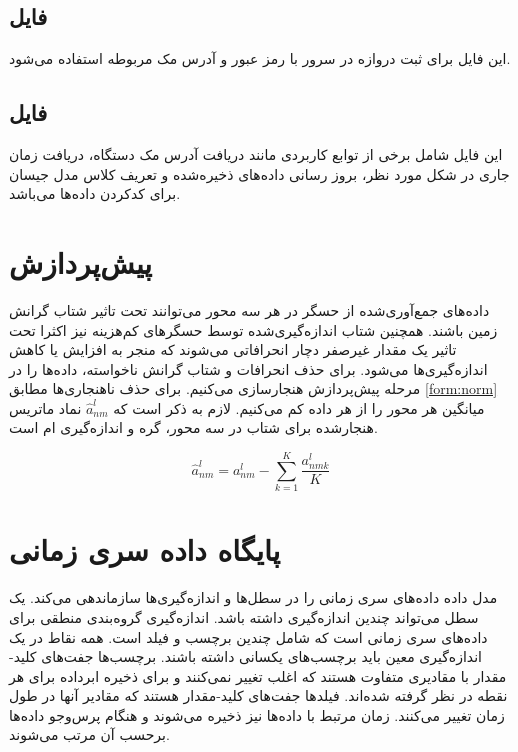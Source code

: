 \subsection{فایل }

این فایل برای ثبت دروازه در سرور با رمز عبور و آدرس مک مربوطه استفاده می‌شود.

\subsection{فایل }

این فایل شامل برخی از توابع کاربردی مانند دریافت آدرس مک دستگاه، دریافت زمان جاری در شکل مورد نظر، بروز رسانی داده‌های ذخیره‌شده و تعریف کلاس مدل جیسان برای کد‌کردن داده‌ها می‌باشد.

\section{پیش‌پردازش}

داده‌های جمع‌آوری‌شده از حسگر در هر سه محور می‌توانند تحت تاثیر شتاب گرانش زمین باشند. همچنین شتاب اندازه‌گیری‌شده توسط حسگرهای کم‌هزینه  نیز اکثرا تحت تاثیر یک مقدار غیرصفر دچار انحرافاتی می‌شوند که منجر به افزایش یا کاهش اندازه‌گیری‌ها می‌شود\cite{jung2017vibration}. برای حذف انحرافات و شتاب گرانش ناخواسته، داده‌ها را در مرحله پیش‌پردازش هنجارسازی می‌کنیم. برای حذف ناهنجاری‌ها مطابق \cref{form:norm} میانگین هر محور را از هر داده کم می‌کنیم. لازم به ذکر است که $\hat{a}^l_{nm}$ نماد ماتریس هنجارشده برای شتاب در سه محور، گره  و اندازه‌گیری ام است.

\begin{equation}
\label{form:norm}
\hat{a}^l_{nm}=a^l_{nm}-\sum_{k=1}^K \dfrac{a^l_{nmk}}{K}
\end{equation}

\section{پایگاه داده سری زمانی}

مدل داده  داده‌های سری زمانی را در سطل‌ها و اندازه‌گیری‌ها سازماندهی می‌کند. یک سطل می‌تواند چندین اندازه‌گیری داشته باشد. اندازه‌گیری گروه‌بندی منطقی برای داده‌های سری زمانی است که شامل چندین برچسب و فیلد است. همه نقاط در یک اندازه‌گیری معین باید برچسب‌های یکسانی داشته باشند. برچسب‌ها جفت‌های کلید-مقدار با مقادیری متفاوت هستند که اغلب تغییر نمی‌کنند و برای ذخیره ابرداده برای هر نقطه در نظر گرفته شده‌اند. فیلدها جفت‌های کلید-مقدار هستند که مقادیر آنها در طول زمان تغییر می‌کنند. زمان مرتبط با داده‌ها نیز ذخیره می‌شوند و هنگام پرس‌وجو داده‌ها برحسب آن مرتب می‌شوند\cite{influx_doc}.


